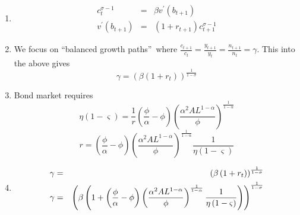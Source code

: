\documentclass[11pt]{article}
\begin{document}
\begin{enumerate}
\item 
\begin{eqnarray*}
c_{t}^{\sigma -1} &=&\beta v^{\prime }(b_{t+1}) \\
v^{\prime }(b_{t+1}) &=&\left( 1+r_{t+1}\right) c_{t+1}^{\sigma -1}
\end{eqnarray*}

\item We focus on \textquotedblleft balanced growth paths\textquotedblright\
where $\frac{c_{t+1}}{c_{t}}=\frac{y_{t+1}}{y_{t}}=\frac{n_{t+1}}{n_{t}}%
=\gamma $. This into the above gives 
\begin{equation*}
\gamma =\left( \beta \left( 1+r_{t}\right) \right) ^{\frac{1}{1-\sigma }}
\end{equation*}

\item Bond market requires%
\begin{equation*}
\eta \left( 1-\varsigma \right) =\frac{1}{r}\left( \frac{\phi }{\alpha }%
-\phi \right) \left( \frac{\alpha ^{2}AL^{1-\alpha }}{\phi }\right) ^{\frac{1%
}{1-\alpha }}
\end{equation*}%
\begin{equation*}
r=\left( \frac{\phi }{\alpha }-\phi \right) \left( \frac{\alpha
^{2}AL^{1-\alpha }}{\phi }\right) ^{\frac{1}{1-\alpha }}\frac{1}{\eta \left(
1-\varsigma \right) }
\end{equation*}

\item 
\begin{eqnarray*}
\gamma  &=&\left( \beta \left( 1+r_{t}\right) \right) ^{\frac{1}{1-\sigma }}
\\
\gamma  &=&\left( \beta \left( 1+\left( \frac{\phi }{\alpha }-\phi \right)
\left( \frac{\alpha ^{2}AL^{1-\alpha }}{\phi }\right) ^{\frac{1}{1-\alpha }}%
\frac{1}{\eta \left( 1-\varsigma \right) }\right) \right) ^{\frac{1}{%
1-\sigma }}
\end{eqnarray*}
\end{enumerate}
\end{document}
